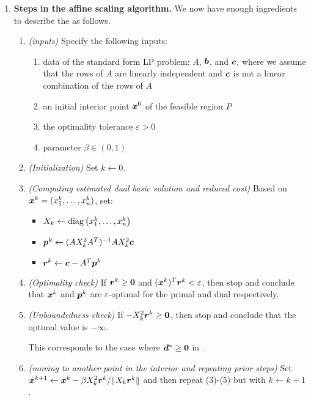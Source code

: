 \begin{enumerate}
\begin{pf}
\end{pf}
\item\label{it:affine-scal-steps} \textbf{Steps in the affine scaling
algorithm.} We now have enough ingredients to describe the  as follows.
\begin{enumerate}[label={(\arabic*)}]
\item \emph{(inputs)} Specify the following inputs:
\begin{enumerate}
\item data of the standard form LP problem: \(A\), \(\bm{b}\), and
\(\bm{c}\), where we assume that the rows of \(A\) are linearly independent
and \(\bm{c}\) is not a linear combination of the rows of \(A\)
\item an initial interior point \(\bm{x}^0\) of the feasible region \(P\)
\item the optimality tolerance \(\varepsilon>0\)
\item parameter \(\beta\in (0,1)\)
\end{enumerate}
\item \emph{(Initialization)} Set \(k\leftarrow 0\).
\item \emph{(Computing estimated dual basic solution and reduced cost)} Based
on \(\bm{x}^{k}=(x_1^{k},\dotsc,x_n^{k})\), set:
\begin{itemize}
\item \(X_k\leftarrow\operatorname{diag}\left(x_1^{k},\dotsc,x_n^{k}\right)\)
\item \(\bm{p}^{k}\leftarrow (AX_k^{2}A^{T})^{-1}AX_{k}^{2}\bm{c}\)
\item \(\bm{r}^{k}\leftarrow \bm{c}-A^{T}\bm{p}^{k}\)
\end{itemize}
\item \emph{(Optimality check)} If \(\bm{r}^{k}\ge\bm{0}\) and
\((\bm{x}^{k})^{T}\bm{r}^{k}<\varepsilon\), then stop and conclude that
\(\bm{x}^{k}\) and \(\bm{p}^{k}\) are \(\varepsilon\)-optimal for the
primal and dual respectively.
\item \emph{(Unboundedness check)} If \(-X_k^{2}\bm{r}^{k}\ge\bm{0}\), then
stop and conclude that the optimal value is \(-\infty\).
\begin{note}
This corresponds to the case where \(\bm{d}^{*}\ge\bm{0}\) in
.
\end{note}
\item \emph{(moving to another point in the interior and repeating prior steps)}
Set \(\bm{x}^{k+1}\leftarrow \bm{x}^{k}-\beta
X_k^{2}\bm{r}^{k}/\|X_k\bm{r}^{k}\|\) and then repeat (3)-(5) but with
\(k\leftarrow k+1\).


\end{enumerate}
\end{enumerate}
